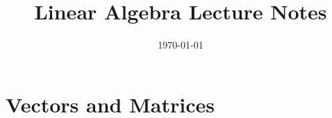 \documentclass[a4paper, oneside, 12pt]{book}
\title{Linear Algebra Lecture Notes}
\date{\today}
\begin{document}
\maketitle
\tableofcontents

\chapter{Vectors and Matrices}


\end{document}
